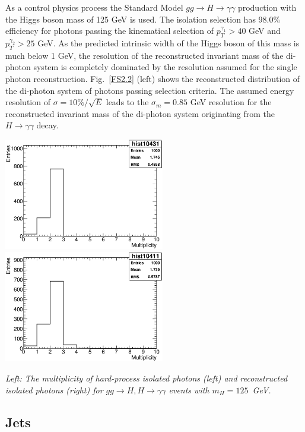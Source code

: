 As a control physics process  the  Standard Model
$gg \to H \to \gamma \gamma$ production with the 
Higgs boson mass of 125 GeV is used. The 
isolation selection has 98.0\% efficiency for photons passing
the  kinematical selection of $p_T^{\gamma_1} > 40$ GeV and $p_T^{\gamma_2} > 25$ GeV.
As the predicted intrinsic width
of the Higgs boson of this mass is much below 1 GeV, the resolution 
of the reconstructed invariant mass of the di-photon system is
completely dominated by the resolution assumed for the 
single photon reconstruction. Fig.~\ref{FS2.2} (left) shows the
reconstructed distribution of the di-photon system of photons passing selection
criteria. The assumed energy resolution of $\sigma = 10\%/\sqrt{E}$
leads to the $\sigma_m = 0.85$ GeV resolution for the reconstructed
invariant mass of the di-photon system originating from the 
$ H \to \gamma \gamma$ decay.
 
\begin{Fighere}
\begin{center}
   \includegraphics[width=7.0cm,angle=0]{plot-HPisolPhotons.eps}
   \includegraphics[width=7.0cm,angle=0]{plot-recoPhotons.eps}
\end{center}
\caption{\em
Left: The multiplicity of  hard-process isolated photons (left) and reconstructed isolated photons (right) 
for $gg \to H, H \to \gamma \gamma$ events with $m_H=125$~GeV.
\label{FS2.2}} 
\end{Fighere}


\boldmath 
\subsection{Jets}
\unboldmath

